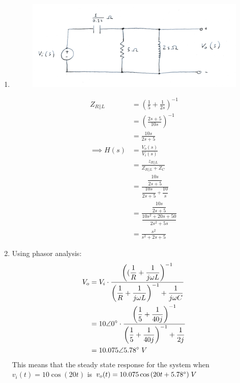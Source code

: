 \begin{enumerate}
	
	\item{
	\text{ }
		\begin{figure}[H]
		\begin{center}
		\includegraphics[scale=0.75]{3a.JPG}
		\end{center}
		\end{figure}
		\begin{align*}
		Z_{R||L} &= (\frac{1}{5} + \frac{1}{2s})^{-1}\\
		&= (\frac{2s+5}{10s})^{-1}\\
		&= \frac{10s}{2s+5}\\
		\implies H(s) &= \frac{V_o(s)}{V_i(s)}\\
		&= \frac{z_{R||L}}{Z_{R||L} + Z_C}\\
		&= \frac{\dfrac{10s}{2s+5}}{\dfrac{10s}{2s+5} + \dfrac{10}{s}}\\
		&= \frac{\dfrac{10s}{2s+5}}{\dfrac{10s^2+20s+50}{2s^2+5s}}\\
		&= \frac{s^2}{s^2+2s+5}
		\end{align*}
	}
	\item{
		Using phasor analysis:
		\begin{align*}
		V_o &= V_i \cdot \frac{\left((\dfrac{1}{R} + \dfrac{1}
		{j \omega L}\right)^{-1}}{\left(\dfrac{1}{R} + \dfrac{1}
		{j \omega L}\right)^{-1} + \dfrac{1}{j \omega C}}\\
		&= 10 \angle 0\degree \cdot \frac{\left( \dfrac{1}{5} + 
		\dfrac{1}{40j} \right)^{-1}}{\left( \dfrac{1}{5} + 
		\dfrac{1}{40j} \right)^{-1} + \dfrac{1}{2j}}\\
		&= 10.075 \angle 5.78\degree \;V
		\end{align*}
		This means that the steady state response for the 
		system when $v_i(t) = 10\cos{(20t)}$ is $v_o(t) = 
		10.075 \cos{(20t + 5.78\degree)}\;V$
	}
\end{enumerate}